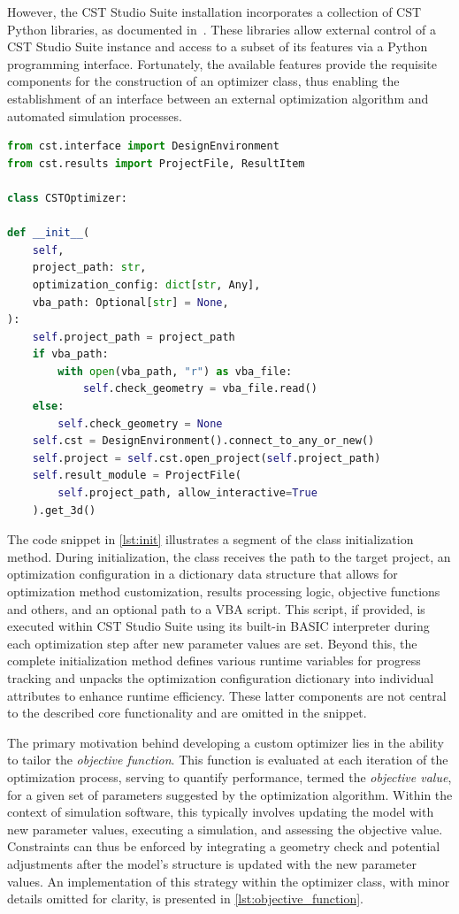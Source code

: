\documentclass[11pt,a4paper,twoside,openany]{report}
\begin{document}
However, the CST Studio Suite installation incorporates a collection of CST Python libraries, as documented in~\parencite{cst:python-libraries-documentation}. These libraries allow external control of a CST Studio Suite instance and access to a subset of its features via a Python programming interface.  Fortunately, the available features provide the requisite components for the construction of an optimizer class, thus enabling the establishment of an interface between an external optimization algorithm and automated simulation processes.

\begin{lstlisting}[caption={Optimizer class initialization}, label={lst:init}, language=Python]
from cst.interface import DesignEnvironment
from cst.results import ProjectFile, ResultItem

class CSTOptimizer:

def __init__(
    self,
    project_path: str,
    optimization_config: dict[str, Any],
    vba_path: Optional[str] = None,
):
    self.project_path = project_path
    if vba_path:
        with open(vba_path, "r") as vba_file:
            self.check_geometry = vba_file.read()
    else:
        self.check_geometry = None
    self.cst = DesignEnvironment().connect_to_any_or_new()
    self.project = self.cst.open_project(self.project_path)
    self.result_module = ProjectFile(
        self.project_path, allow_interactive=True
    ).get_3d()
\end{lstlisting}

The code snippet in \cref{lst:init} illustrates a segment of the class initialization method. During initialization, the class receives the path to the target project, an optimization configuration in a dictionary data structure that allows for optimization method customization, results processing logic, objective functions and others, and an optional path to a VBA script. This script, if provided, is executed within CST Studio Suite using its built-in BASIC interpreter during each optimization step after new parameter values are set. Beyond this, the complete initialization method defines various runtime variables for progress tracking and unpacks the optimization configuration dictionary into individual attributes to enhance runtime efficiency. These latter components are not central to the described core functionality and are omitted in the snippet.

The primary motivation behind developing a custom optimizer lies in the ability to tailor the \emph{objective function}. This function is evaluated at each iteration of the optimization process, serving to quantify performance, termed the \emph{objective value}, for a given set of parameters suggested by the optimization algorithm. Within the context of simulation software, this typically involves updating the model with new parameter values, executing a simulation, and assessing the objective value. Constraints can thus be enforced by integrating a geometry check and potential adjustments after the model's structure is updated with the new parameter values. An implementation of this strategy within the optimizer class, with minor details omitted for clarity, is presented in \cref{lst:objective_function}.
\end{document}
